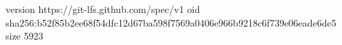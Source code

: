 version https://git-lfs.github.com/spec/v1
oid sha256:b52f85b2ee68f54dfc12d67ba598f7569a0406e966b9218c6f739e06eade6de5
size 5923
